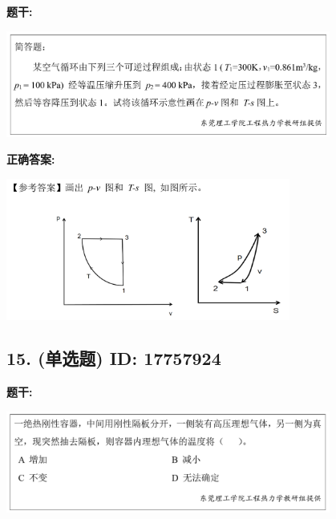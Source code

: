 \documentclass[12pt]{article}
\begin{document}
\textbf{题干:}


\begin{center}\includegraphics[width=0.8\textwidth, height=0.25\textheight, keepaspectratio]{question_14_17757936/title_img_1.png}\end{center}

\textbf{正确答案:}

\begin{center}\includegraphics[width=0.7\textwidth, height=0.2\textheight, keepaspectratio]{question_14_17757936/correct_answer_1_img_1.png}\end{center}

\vspace{0.5em}\hrulefill\vspace{1em}

\subsection*{15. (单选题) \small ID: 17757924}

\textbf{题干:}


\begin{center}\includegraphics[width=0.8\textwidth, height=0.25\textheight, keepaspectratio]{question_15_17757924/title_img_1.png}\end{center}
\end{document}
